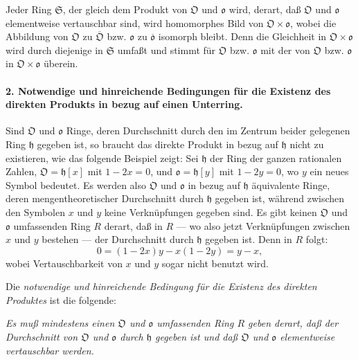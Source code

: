Jeder Ring $\mathfrak S$, der gleich dem Produkt von $\mathfrak O$ und $\mathfrak o$ wird, derart, daß $\mathfrak O$ und $\mathfrak o$ elementweise vertauschbar sind, wird homomorphes Bild von $\mathfrak O\times\mathfrak o$, wobei die Abbildung von $\mathfrak O$ zu $\overline{\mathfrak O}$ bzw. $\mathfrak o$ zu $\overline{\mathfrak o}$ isomorph bleibt. Denn die Gleichheit in $\mathfrak O\times\mathfrak o$ wird durch diejenige in $\mathfrak S$ umfaßt und stimmt für $\mathfrak O$ bzw. $\mathfrak o$ mit der von $\mathfrak O$ bzw. $\mathfrak o$ in $\mathfrak O\times\mathfrak o$ überein.

\paragraph{2. Notwendige und hinreichende Bedingungen für die Existenz des direkten Produkts in bezug auf einen Unterring.}
Sind $\mathfrak O$ und $\mathfrak o$ Ringe, deren Durchschnitt durch den im Zentrum beider gelegenen Ring $\mathfrak h$ gegeben ist, so braucht das direkte Produkt in bezug auf $\mathfrak h$ nicht zu existieren, wie das folgende Beispiel zeigt: Sei $\mathfrak h$ der Ring der ganzen rationalen Zahlen, $\mathfrak O=\mathfrak h[x]$ mit $1-2x=0$, und $\mathfrak o=\mathfrak h[y]$ mit $1-2y=0$, wo $y$ ein neues Symbol bedeutet. Es werden also $\mathfrak O$ und $\mathfrak o$ in bezug auf $\mathfrak h$ äquivalente Ringe, deren mengentheoretischer Durchschnitt durch $\mathfrak h$ gegeben ist, während zwischen den Symbolen $x$ und $y$ keine Verknüpfungen gegeben sind. Es gibt keinen $\mathfrak O$ und $\mathfrak o$ umfassenden Ring $R$ derart, daß in $R$ --- wo also jetzt Verknüpfungen zwischen $x$ und $y$ bestehen --- der Durchschnitt durch $\mathfrak h$ gegeben ist. Denn in $R$ folgt:
\[
0=(1-2x)y-x(1-2y)=y-x,
\]
wobei Vertauschbarkeit von $x$ und $y$ sogar nicht benutzt wird.

Die \emph{notwendige und hinreichende Bedingung für die Existenz des direkten Produktes} ist die folgende:

\emph{Es muß mindestens einen $\mathfrak O$ und $\mathfrak o$ umfassenden Ring $R$ geben derart, daß der Durchschnitt von $\mathfrak O$ und $\mathfrak o$ durch $\mathfrak h$ gegeben ist und daß $\mathfrak O$ und $\mathfrak o$ elementweise vertauschbar werden.}

